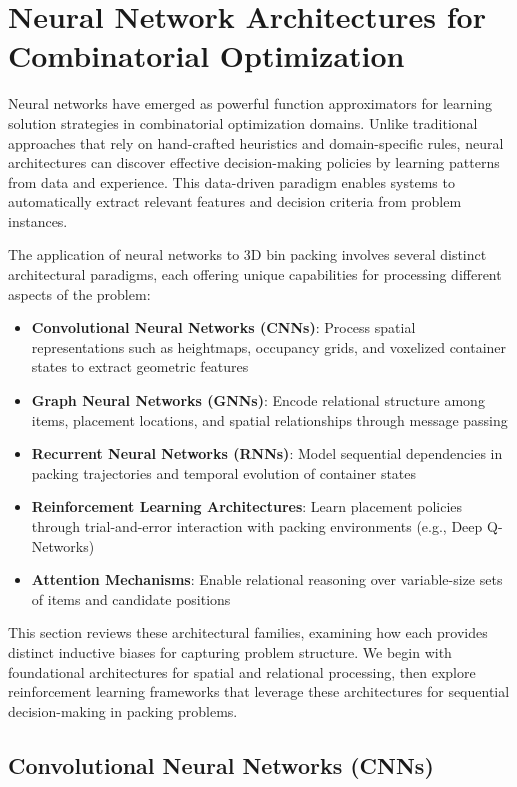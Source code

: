 \section{Neural Network Architectures for Combinatorial Optimization}

Neural networks have emerged as powerful function approximators for learning solution strategies in combinatorial optimization domains. Unlike traditional approaches that rely on hand-crafted heuristics and domain-specific rules, neural architectures can discover effective decision-making policies by learning patterns from data and experience. This data-driven paradigm enables systems to automatically extract relevant features and decision criteria from problem instances.

The application of neural networks to 3D bin packing involves several distinct architectural paradigms, each offering unique capabilities for processing different aspects of the problem:

\begin{itemize}
\item \textbf{Convolutional Neural Networks (CNNs)}: Process spatial representations such as heightmaps, occupancy grids, and voxelized container states to extract geometric features
\item \textbf{Graph Neural Networks (GNNs)}: Encode relational structure among items, placement locations, and spatial relationships through message passing
\item \textbf{Recurrent Neural Networks (RNNs)}: Model sequential dependencies in packing trajectories and temporal evolution of container states
\item \textbf{Reinforcement Learning Architectures}: Learn placement policies through trial-and-error interaction with packing environments (e.g., Deep Q-Networks)
\item \textbf{Attention Mechanisms}: Enable relational reasoning over variable-size sets of items and candidate positions
\end{itemize}

This section reviews these architectural families, examining how each provides distinct inductive biases for capturing problem structure. We begin with foundational architectures for spatial and relational processing, then explore reinforcement learning frameworks that leverage these architectures for sequential decision-making in packing problems.


\subsection{Convolutional Neural Networks (CNNs)}


